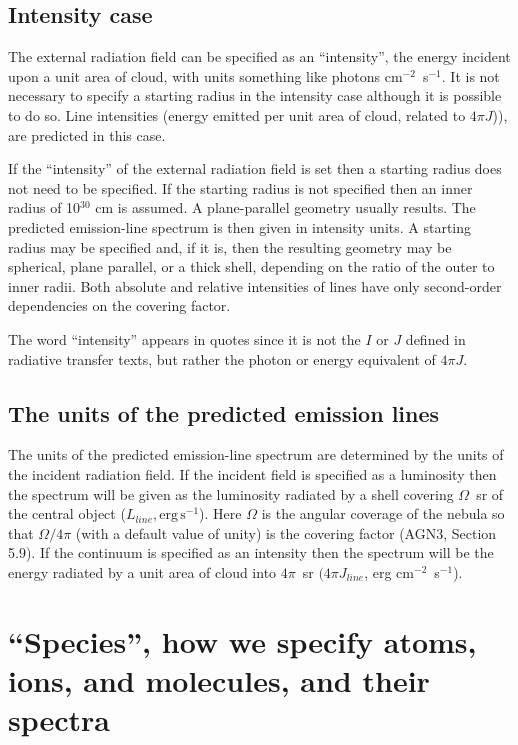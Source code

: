 \subsection{Intensity case}

The external radiation field can be specified as an ``intensity'',
the energy
incident upon a unit area of cloud, with units
something like photons cm$^{-2}$~s$^{-1}$.
It is not necessary to specify a starting radius in the intensity case
although it is possible to do so.
Line intensities (energy emitted per
unit area of cloud, related to $4\pi J$)), are predicted in this case.

If the ``intensity'' of the external radiation field is set then a starting radius does not
need to be specified.
If the starting radius is not specified then an inner
radius of 10$^{30}$ cm is assumed.  A plane-parallel geometry usually results.
The predicted emission-line spectrum is then given in intensity units.
A starting radius may be specified and, if it is, then the resulting geometry
may be spherical, plane parallel, or a thick shell, depending on the ratio
of the outer to inner radii.  Both absolute and relative intensities of
lines have only second-order dependencies on the covering factor.

The word ``intensity'' appears in quotes since it is
not the $I$ or $J$ defined in radiative transfer texts, but rather the photon
or energy equivalent of $4\pi J$.

\subsection{The units of the predicted emission lines}

The units of the predicted emission-line spectrum are determined by the
units of the incident radiation field.
If the incident field is specified as a
luminosity then the spectrum will be given as the luminosity radiated by
a shell covering  $\Omega$~sr of the central object ($L_{line}, \mathrm{erg\,
s}^{-1}$).  Here $\Omega$ is the
angular coverage of the nebula so that $\Omega/4\pi$ (with a default value of unity)
is the covering factor (AGN3, Section 5.9).  If the
continuum is specified as an intensity then the spectrum will be the energy
radiated by a unit area of cloud into $4\pi$~sr $(4\pi J_{line}$, erg
cm$^{-2}$~s$^{-1}$).

\section{``Species'', how we specify atoms, ions, and molecules, and their spectra}
\label{sec:SpeciesDefine}

